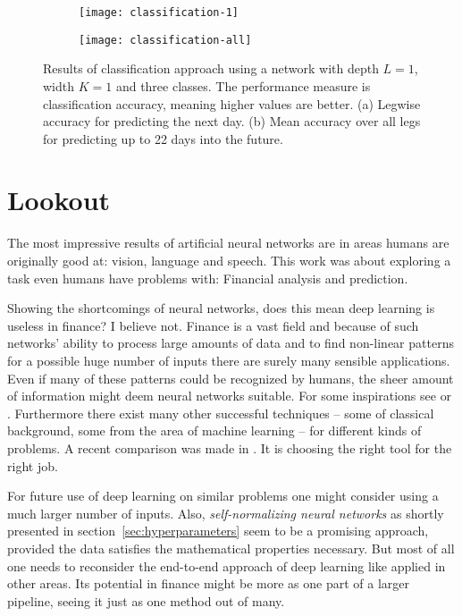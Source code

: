 \begin{figure}
	\centering
	\begin{subfigure}{0.49\linewidth}
		\texttt{[image: classification-1]}
		\caption{}
	\end{subfigure}
	\begin{subfigure}{0.49\linewidth}
		\texttt{[image: classification-all]}
		\caption{}
	\end{subfigure}
	\caption[Results of classification approach]{Results of classification approach using a network with depth $L=1$, width $K=1$ and three classes. The performance measure is classification accuracy, meaning higher values are better. (a) Legwise accuracy for predicting the next day. (b) Mean accuracy over all legs for predicting up to 22 days into the future.}
	\label{fig:classification-results}
\end{figure}

\section{Lookout}

The most impressive results of artificial neural networks are in areas humans are originally good at: vision, language and speech. This work was about exploring a task even humans have problems with: Financial analysis and prediction. 

Showing the shortcomings of neural networks, does this mean deep learning is useless in finance? I believe not. Finance is a vast field and because of such networks' ability to process large amounts of data and to find non-linear patterns for a possible huge number of inputs there are surely many sensible applications. Even if many of these patterns could be recognized by humans, the sheer amount of information might deem neural networks suitable. For some inspirations see \cite{DBLP:journals/corr/HeatonPW16} or \cite{Mao-2011}.
Furthermore there exist many other successful techniques -- some of classical background, some from the area of machine learning -- for different kinds of problems. A recent comparison was made in \cite{DBLP:journals/corr/QianG17}. It is choosing the right tool for the right job.

For future use of deep learning on similar problems one might consider using a much larger number of inputs. Also, \emph{self-normalizing neural networks} as shortly presented in section~\ref{sec:hyperparameters} seem to be a promising approach, provided the data satisfies the mathematical properties necessary. But most of all one needs to reconsider the end-to-end approach of deep learning like applied in other areas. Its potential in finance might be more as one part of a larger pipeline, seeing it just as one method out of many.
